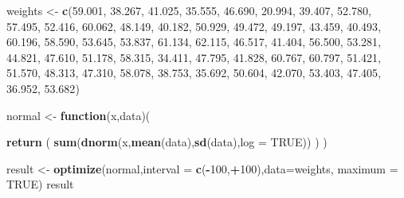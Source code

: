 \documentclass[
]{article}
\newenvironment{Shaded}{\begin{snugshade}}{\end{snugshade}}
\newcommand{\AttributeTok}[1]{\textcolor[rgb]{0.13,0.29,0.53}{#1}}
\newcommand{\ConstantTok}[1]{\textcolor[rgb]{0.56,0.35,0.01}{#1}}
\newcommand{\ControlFlowTok}[1]{\textcolor[rgb]{0.13,0.29,0.53}{\textbf{#1}}}
\newcommand{\DecValTok}[1]{\textcolor[rgb]{0.00,0.00,0.81}{#1}}
\newcommand{\FloatTok}[1]{\textcolor[rgb]{0.00,0.00,0.81}{#1}}
\newcommand{\FunctionTok}[1]{\textcolor[rgb]{0.13,0.29,0.53}{\textbf{#1}}}
\newcommand{\NormalTok}[1]{#1}
\newcommand{\OtherTok}[1]{\textcolor[rgb]{0.56,0.35,0.01}{#1}}
\newcommand{\SpecialCharTok}[1]{\textcolor[rgb]{0.81,0.36,0.00}{\textbf{#1}}}
\begin{document}
\begin{Shaded}
\begin{Highlighting}[]
\NormalTok{weights }\OtherTok{\textless{}{-}} \FunctionTok{c}\NormalTok{(}\FloatTok{59.001}\NormalTok{, }\FloatTok{38.267}\NormalTok{, }\FloatTok{41.025}\NormalTok{, }\FloatTok{35.555}\NormalTok{, }\FloatTok{46.690}\NormalTok{, }\FloatTok{20.994}\NormalTok{, }\FloatTok{39.407}\NormalTok{, }\FloatTok{52.780}\NormalTok{, }
             \FloatTok{57.495}\NormalTok{, }\FloatTok{52.416}\NormalTok{, }\FloatTok{60.062}\NormalTok{, }\FloatTok{48.149}\NormalTok{, }\FloatTok{40.182}\NormalTok{, }\FloatTok{50.929}\NormalTok{, }\FloatTok{49.472}\NormalTok{, }\FloatTok{49.197}\NormalTok{, }
             \FloatTok{43.459}\NormalTok{, }\FloatTok{40.493}\NormalTok{, }\FloatTok{60.196}\NormalTok{, }\FloatTok{58.590}\NormalTok{, }\FloatTok{53.645}\NormalTok{, }\FloatTok{53.837}\NormalTok{, }\FloatTok{61.134}\NormalTok{, }\FloatTok{62.115}\NormalTok{, }
             \FloatTok{46.517}\NormalTok{, }\FloatTok{41.404}\NormalTok{, }\FloatTok{56.500}\NormalTok{, }\FloatTok{53.281}\NormalTok{, }\FloatTok{44.821}\NormalTok{, }\FloatTok{47.610}\NormalTok{, }\FloatTok{51.178}\NormalTok{, }\FloatTok{58.315}\NormalTok{, }
             \FloatTok{34.411}\NormalTok{, }\FloatTok{47.795}\NormalTok{, }\FloatTok{41.828}\NormalTok{, }\FloatTok{60.767}\NormalTok{, }\FloatTok{60.797}\NormalTok{, }\FloatTok{51.421}\NormalTok{, }\FloatTok{51.570}\NormalTok{, }\FloatTok{48.313}\NormalTok{, }
             \FloatTok{47.310}\NormalTok{, }\FloatTok{58.078}\NormalTok{, }\FloatTok{38.753}\NormalTok{, }\FloatTok{35.692}\NormalTok{, }\FloatTok{50.604}\NormalTok{, }\FloatTok{42.070}\NormalTok{, }\FloatTok{53.403}\NormalTok{, }\FloatTok{47.405}\NormalTok{, }
             \FloatTok{36.952}\NormalTok{, }\FloatTok{53.682}\NormalTok{)}

\NormalTok{normal }\OtherTok{\textless{}{-}} \ControlFlowTok{function}\NormalTok{(x,data)(}
  
  \FunctionTok{return}\NormalTok{ (}
    \FunctionTok{sum}\NormalTok{(}\FunctionTok{dnorm}\NormalTok{(x,}\FunctionTok{mean}\NormalTok{(data),}\FunctionTok{sd}\NormalTok{(data),}\AttributeTok{log =} \ConstantTok{TRUE}\NormalTok{))}
\NormalTok{  )}
\NormalTok{)}

\NormalTok{result }\OtherTok{\textless{}{-}} \FunctionTok{optimize}\NormalTok{(normal,}\AttributeTok{interval =} \FunctionTok{c}\NormalTok{(}\SpecialCharTok{{-}}\DecValTok{100}\NormalTok{,}\SpecialCharTok{+}\DecValTok{100}\NormalTok{),}\AttributeTok{data=}\NormalTok{weights, }\AttributeTok{maximum =} \ConstantTok{TRUE}\NormalTok{)}
\NormalTok{result}
\end{Highlighting}
\end{Shaded}
\end{document}
